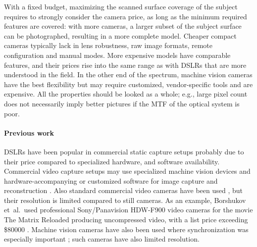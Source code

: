 With a fixed budget, maximizing the scanned surface coverage of the subject requires to strongly consider the camera price, as long as the minimum required features are covered: with more cameras, a larger subset of the subject surface can be photographed, resulting in a more complete model.
Cheaper compact cameras typically lack in lens robustness, raw image formats, remote configuration and manual modes.
More expensive models have comparable features, and their prices rise into the same range as with DSLRs that are more understood in the field.
In the other end of the spectrum, machine vision cameras have the best flexibility but may require customized, vendor-specific tools and are expensive.
All the properties should be looked as a whole; e.g., large pixel count does not necessarily imply better pictures if the MTF of the optical system is poor.

\paragraph{Previous work}
DSLRs have been popular in commercial static capture setups \cite{ir-ltd,ten24,capturelab,agisoftforum,winder2008technical} probably due to their price compared to specialized hardware, and software availability.
Commercial video capture setups may use specialized machine vision devices and hardware-accompanying or customized software for image capture and reconstruction \cite{al2013new}.
Also standard commercial video cameras have been used \cite{bradley2010high}, but their resolution is limited compared to still cameras.
As an example, Borshukov et~al.\ used professional Sony/Panavision HDW-F900 video cameras for the movie The Matrix Reloaded \cite{borshukov05universal} producing uncompressed video, with a list price exceeding \$80000 \cite{sonyhdwf900r}.
Machine vision cameras have also been used where synchronization was especially important \cite{carceroni2002multi,bickel2007multi}; such cameras have also limited resolution.

